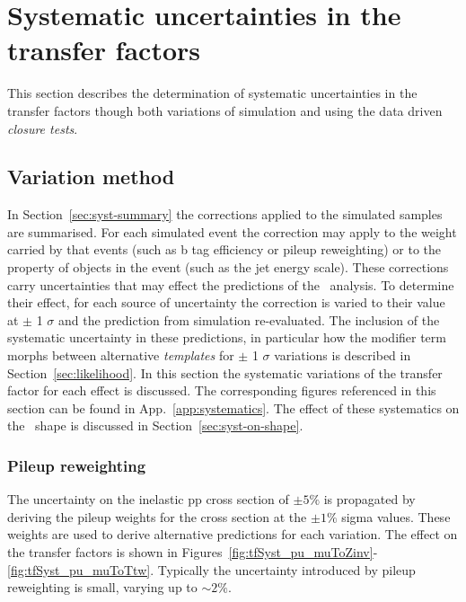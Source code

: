 \section{Systematic uncertainties in the transfer factors}
\label{sec:syst-uncs}
This section describes the determination of systematic uncertainties 
in the transfer factors though both variations of simulation
and using the data driven \emph{closure tests}. 

\subsection{Variation method}
\label{sec:syst-uncs-var}
In Section~\ref{sec:syst-summary} the corrections applied to the simulated samples are summarised. For each 
simulated event the correction may apply to the weight carried by that events (such as b tag efficiency
or pileup reweighting) or to the property of objects in the event (such as the jet energy scale). 
These corrections carry uncertainties that may effect the predictions of the \alphat~analysis.
To determine their effect, for each source of uncertainty the correction is varied to their
value at $\pm$ 1 $\sigma$ and the prediction from simulation re-evaluated. The inclusion of the systematic uncertainty 
in these predictions, in particular how the modifier term morphs between alternative \emph{templates} 
for $\pm$ 1 $\sigma$ variations is described in Section~\ref{sec:likelihood}. In this section the systematic variations
of the transfer factor for each effect is discussed. The corresponding figures referenced in
this section can be found in App.~\ref{app:systematics}. The effect of these systematics on 
the \mht~shape is discussed in Section~\ref{sec:syst-on-shape}.

\subsubsection{Pileup reweighting}

The uncertainty on the inelastic pp cross section of $\pm5\%$ is propagated by deriving the pileup
weights for the cross section at the $\pm1\%$ sigma values. These weights are used to derive
alternative predictions for each variation. The effect on the transfer factors is shown in 
Figures~\ref{fig:tfSyst_pu_muToZinv}-\ref{fig:tfSyst_pu_muToTtw}. Typically the uncertainty 
introduced by pileup reweighting is small, varying up to $\sim2\%$.

